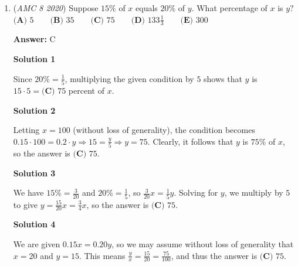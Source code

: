 \begin{enumerate}
 \textbf{Answer: }D



\textbf{Solution}

We can see that the dotted line is exactly halfway between $4{,}500$ and $5{,}000$, so it is at $4{,}750$. As this is the average population of all $20$ cities, the total population is simply $4{,}750 \cdot 20 = \boxed{\textbf{(D) }95{,}000}$.

 



\textbf{Solution 2}

The dotted line is slightly below $5000$. Since $5000\cdot20=100000$, the answer is slightly below this, so $\boxed{\textbf{(D) }95{,}000}$ would be the best choice to guess.

 


	\item (\textit{AMC 8 2020}) Suppose $15\%$ of $x$ equals $20\%$ of $y.$ What percentage of $x$ is $y?$
$\textbf{(A) }5 \qquad \textbf{(B) }35 \qquad \textbf{(C) }75 \qquad \textbf{(D) }133 \frac13 \qquad \textbf{(E) }300$

 \textbf{Answer: }C



\textbf{Solution 1}

Since $20\% = \frac{1}{5}$, multiplying the given condition by $5$ shows that $y$ is $15 \cdot 5 = \boxed{\textbf{(C) }75}$ percent of $x$.

 



\textbf{Solution 2}

Letting $x=100$ (without loss of generality), the condition becomes $0.15\cdot 100 = 0.2\cdot y \Rightarrow 15 = \frac{y}{5} \Rightarrow y=75$. Clearly, it follows that $y$ is $75\%$ of $x$, so the answer is $\boxed{\textbf{(C) }75}$.

 



\textbf{Solution 3}

We have $15\%=\frac{3}{20}$ and $20\%=\frac{1}{5}$, so $\frac{3}{20}x=\frac{1}{5}y$. Solving for $y$, we multiply by $5$ to give $y = \frac{15}{20}x = \frac{3}{4}x$, so the answer is $\boxed{\textbf{(C) }75}$.

 



\textbf{Solution 4}

We are given $0.15x = 0.20y$, so we may assume without loss of generality that $x=20$ and $y=15$. This means $\frac{y}{x}=\frac{15}{20}=\frac{75}{100}$, and thus the answer is $\boxed{\textbf{(C) }75}$.


\end{enumerate}
